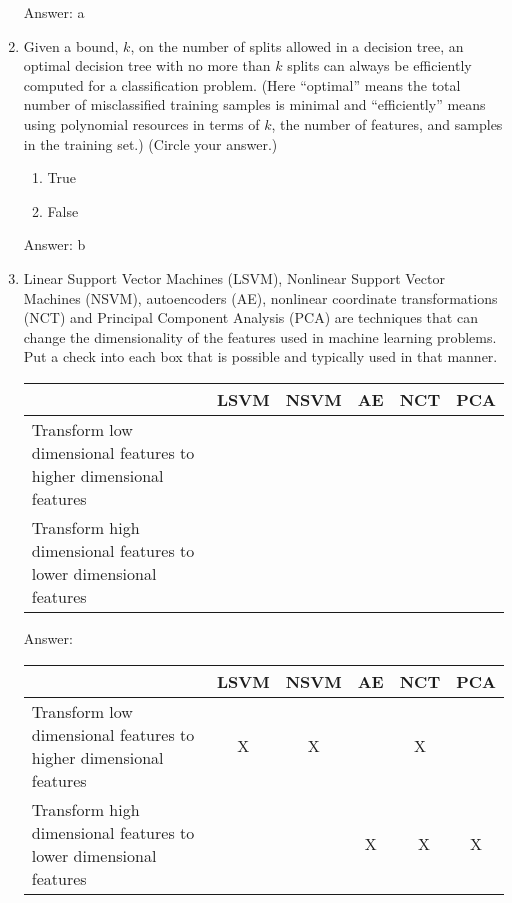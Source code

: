 \documentclass[11pt]{report}
\begin{document}
\begin{enumerate}
\begin{mdframed}
Answer: a
\end{mdframed}
\item
Given a bound, $k$, on the number of  splits allowed in a decision tree,
an optimal decision tree with no more than $k$ splits can always be efficiently computed for a classification problem.
(Here ``optimal'' means the total number of misclassified training samples is minimal and ``efficiently'' means using polynomial resources in terms of $k$, the number of features, and samples in the training set.) (Circle your answer.)
\begin{enumerate}
\item  True
\item  False
\end{enumerate}
\begin{mdframed}
Answer: b
\end{mdframed}
\item
Linear Support Vector Machines (LSVM), Nonlinear Support Vector Machines (NSVM), autoencoders (AE),  nonlinear coordinate transformations (NCT) and Principal Component Analysis (PCA) are techniques that can change the dimensionality of the features used in machine learning problems.
Put a check into each box that is possible and typically used in that manner.
\begin{center}
\begin{tabular}{|p{6cm}|c|c|c|c|c|}
\hline
~&LSVM&NSVM&AE&NCT&PCA\\
\hline
Transform low dimensional features to higher dimensional features&~&~&~&~&~\\
\hline
Transform high dimensional features to lower dimensional features&~&~&~&~&~\\
\hline
\end{tabular}
\end{center}
\begin{mdframed}
Answer:
\begin{center}
\begin{tabular}{|p{6cm}|c|c|c|c|c|}
\hline
~&LSVM&NSVM&AE&NCT&PCA\\
\hline
Transform low dimensional features to higher dimensional features&X&X&~&X&~\\
\hline
Transform high dimensional features to lower dimensional features&~&~&X&~X&X\\
\hline
\end{tabular}
\end{center}
\end{mdframed}

\end{enumerate}
\end{document}
